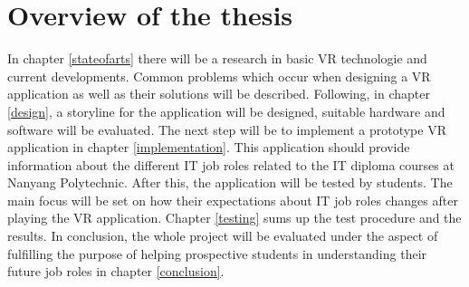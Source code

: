 \section{Overview of the thesis}
In chapter \ref{stateofarts} there will be a  research in basic VR technologie and current developments. Common problems which occur when designing a VR application as well as their solutions will be described. Following, in chapter \ref{design}, a storyline for the application will be designed, suitable hardware and software will be evaluated. The next step will be to implement a prototype VR application in chapter \ref{implementation}. This application should provide information about the different IT job roles related to the IT diploma courses at Nanyang Polytechnic. After this, the application will be tested by students. The main focus will be set on how their expectations about IT job roles changes after playing the VR application. Chapter \ref{testing} sums up the test procedure and the results. In conclusion, the whole project will be evaluated under the aspect of fulfilling the purpose of helping prospective students in understanding their future job roles in chapter \ref{conclusion}.

